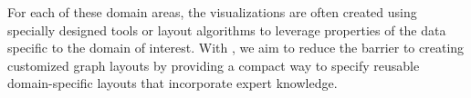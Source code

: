 For each of these domain areas, the visualizations are often created using specially
designed tools or layout algorithms to leverage properties of the data
specific to the domain of interest. With \projectname, we aim to reduce the barrier to
creating customized graph layouts by providing a compact way to specify
reusable domain-specific layouts that incorporate expert knowledge.





